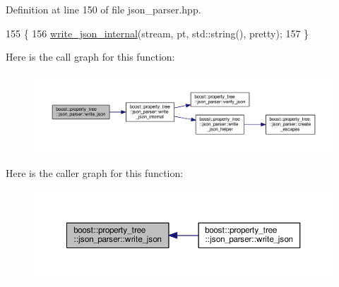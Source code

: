 Definition at line 150 of file json\+\_\+parser.\+hpp.


\begin{DoxyCode}
155 \{
156   \hyperlink{namespaceboost_1_1property__tree_1_1json__parser_af1059520397d396ae91e776391a2f32b}{write\_json\_internal}(stream, pt, std::string(), pretty);
157 \}
\end{DoxyCode}


Here is the call graph for this function\+:
\nopagebreak
\begin{figure}[H]
\begin{center}
\leavevmode
\includegraphics[width=350pt]{namespaceboost_1_1property__tree_1_1json__parser_ad290247428581132003df8706e3ef9d0_cgraph}
\end{center}
\end{figure}




Here is the caller graph for this function\+:
\nopagebreak
\begin{figure}[H]
\begin{center}
\leavevmode
\includegraphics[width=350pt]{namespaceboost_1_1property__tree_1_1json__parser_ad290247428581132003df8706e3ef9d0_icgraph}
\end{center}
\end{figure}


